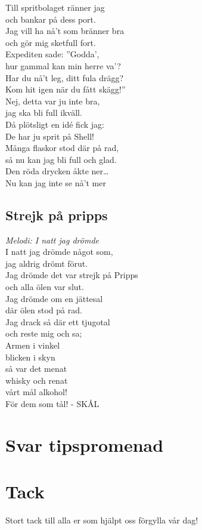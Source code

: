 \documentclass[a5paper]{article}
\begin{document}
\noindent
Till spritbolaget ränner jag \\
och bankar på dess port. \\
Jag vill ha nå’t som bränner bra \\
och gör mig sketfull fort. \\
Expediten sade: ”Godda’, \\
hur gammal kan min herre va’? \\
Har du nå’t leg, ditt fula drägg? \\
Kom hit igen när du fått skägg!” \\

\noindent
Nej, detta var ju inte bra, \\
jag ska bli full ikväll. \\
Då plötsligt en idé fick jag: \\
De har ju sprit på Shell! \\
Många flaskor stod där på rad, \\
så nu kan jag bli full och glad. \\
Den röda drycken åkte ner… \\
Nu kan jag inte se nå’t mer	\\
	
\subsection{Strejk på pripps}
\textit{Melodi: I natt jag drömde}\\

\noindent
I natt jag drömde något som,\\
jag aldrig drömt förut.\\ 
Jag drömde det var strejk på Pripps\\
och alla ölen var slut.\\
Jag drömde om en jättesal\\
där ölen stod på rad.\\
Jag drack så där ett tjugotal\\
och reste mig och sa;\\

\noindent
Armen i vinkel\\
blicken i skyn\\
så var det menat\\
whisky och renat\\
vårt mål alkohol!\\
För dem som tål! - SKÅL\\
\newpage


\section{Svar tipspromenad}


\newpage

\section{Tack}
Stort tack till alla er som hjälpt oss förgylla vår dag!
\end{document}
